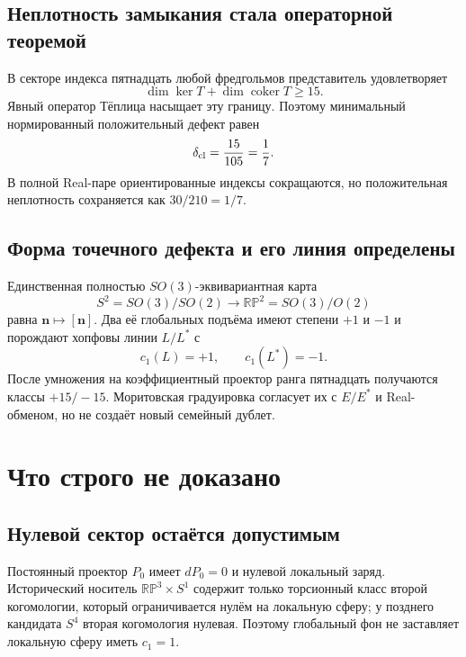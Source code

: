 \subsection{Неплотность замыкания стала операторной теоремой}

В секторе индекса пятнадцать любой фредгольмов представитель удовлетворяет
\begin{equation}
 \dim\ker T+\dim\operatorname{coker}T\geq15.
\end{equation}
Явный оператор Тёплица насыщает эту границу. Поэтому минимальный
нормированный положительный дефект равен
\begin{equation}
 \delta_{\rm cl}=\frac{15}{105}=\frac17.
 \label{eq:v5-final-closure-deficit}
\end{equation}
В полной Real-паре ориентированные индексы сокращаются, но положительная
неплотность сохраняется как $30/210=1/7$.

\subsection{Форма точечного дефекта и его линия определены}

Единственная полностью $SO(3)$-эквивариантная карта
\begin{equation}
 S^2=SO(3)/SO(2)
 \longrightarrow
 \mathbb{RP}^2=SO(3)/O(2)
\end{equation}
равна $\mathbf n\mapsto[\mathbf n]$. Два её глобальных подъёма имеют
степени $+1$ и $-1$ и порождают хопфовы линии $L/L^*$ с
\begin{equation}
 c_1(L)=+1,
 \qquad
 c_1(L^*)=-1.
\end{equation}
После умножения на коэффициентный проектор ранга пятнадцать получаются
классы $+15/-15$. Моритовская градуировка согласует их с $E/E^*$ и
Real-обменом, но не создаёт новый семейный дублет.

\section{Что строго не доказано}

\subsection{Нулевой сектор остаётся допустимым}

Постоянный проектор $P_0$ имеет $dP_0=0$ и нулевой локальный заряд.
Исторический носитель $\mathbb{RP}^3\times S^1$ содержит только торсионный
класс второй когомологии, который ограничивается нулём на локальную сферу;
у позднего кандидата $S^4$ вторая когомология нулевая. Поэтому глобальный
фон не заставляет локальную сферу иметь $c_1=1$.

